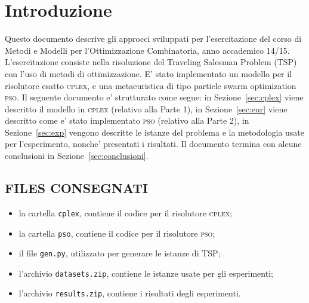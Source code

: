 \documentclass[
12pt, %
a4paper, %
oneside, %
headinclude,footinclude, %
BCOR5mm, %
]{scrartcl}
\begin{document}





\section{Introduzione}

Questo documento descrive gli approcci sviluppati per l'esercitazione del corso di Metodi e Modelli per l'Ottimizzazione Combinatoria, anno accademico 14/15. L'esercitazione consiste nella risoluzione del  Traveling Salesman Problem (TSP) con l'uso di metodi di ottimizzazione. E' stato implementato un modello per il risolutore esatto \textsc{cplex}, e una metaeuristica di tipo particle swarm optimization \textsc{pso}. Il seguente documento e' strutturato come segue: in Sezione~\ref{sec:cplex} viene descritto il modello in \textsc{cplex} (relativo alla Parte 1), in Sezione~\ref{sec:eur} viene descritto come e' stato implementato \textsc{pso} (relativo alla Parte 2), in Sezione~\ref{sec:exp} vengono descritte le istanze del problema e la metodologia usate per l'esperimento, nonche' presentati i risultati. Il documento termina con alcune conclusioni in Sezione~\ref{sec:conclusioni}.

\subsection{FILES CONSEGNATI} 
\begin{itemize}
\setlength\itemsep{0.05cm}
\item la cartella \texttt{cplex}, contiene il codice per il risolutore \textsc{cplex};
\item la cartella \texttt{pso}, contiene il codice per il risolutore \textsc{pso};
\item il file \texttt{gen.py}, utilizzato per generare le istanze di TSP;
\item l'archivio \texttt{datasets.zip}, contiene le istanze usate per gli esperimenti;
\item l'archivio \texttt{results.zip}, contiene i risultati degli esperimenti.
\end{itemize}
\end{document}
